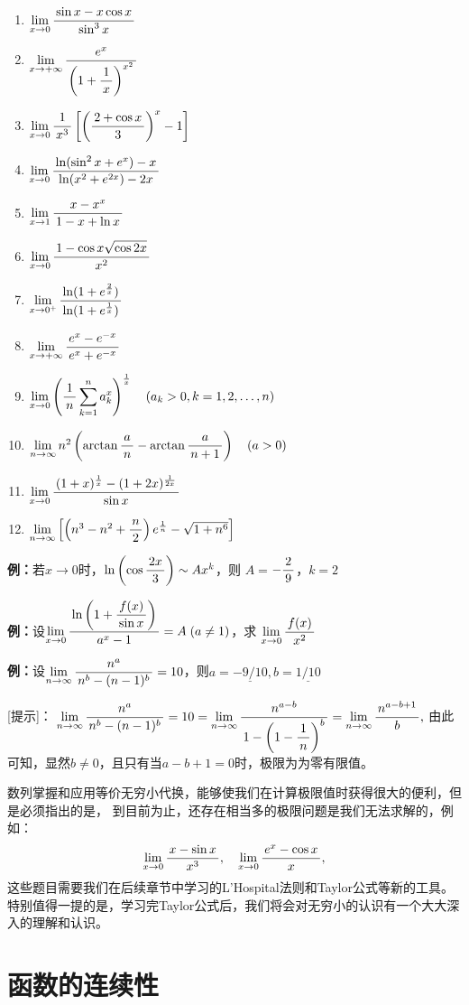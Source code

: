 \begin{enumerate}[(1)]
  \item $\limx0\df{\sin x-x\cos x}{\sin^3x}$
  \item $\limx{+\infty}\df{e^x}{\left(1+\df1x\right)^{x^2}}$
  \item $\limx0\df1{x^3}\left[\left(\df{2+\cos x}3\right)^x-1\right]$
  \item $\limx0\df{\ln(\sin^2x+e^x)-x}{\ln(x^2+e^{2x})-2x}$
  \item $\limx1\df{x-x^x}{1-x+\ln x}$
  \item $\limx0\df{1-\cos x\sqrt{\cos2x}}{x^2}$
  \item $\limx{0^+}\df{\ln(1+e^{\frac2x})}{\ln(1+e^{\frac1x})}$
  \item $\limx{+\infty}\df{e^x-e^{-x}}{e^x+e^{-x}}$
  \item $\limx0\left(\df1n\sum\limits_{k=1}^na_k^x\right)^{\frac1x}
  \quad (a_k>0,k=1,2,\ldots,n)$
  \item $\limn n^2\left(\arctan\df an-\arctan\df a{n+1}\right)\quad (a>0)$
  \item $\limx0\df{(1+x)^{\frac1x}-(1+2x)^{\frac1{2x}}}{\sin x}$
  \item $\limn\left[\left(n^3-n^2+\df n2\right)e^{\frac1n}-\sqrt{1+n^6}\right]$
\end{enumerate}

{\bf 例：}若$x\to 0$时，$\ln\left(\cos\df{2x}3\right)\sim Ax^k$，则
$A=$\underline{$-\df29$}，$k=$\underline{$2$}

{\bf 例：}设$\limx0\df{\ln\left(1+\df{f(x)}{\sin x}\right)}{a^x-1}=A\;(a\ne 1)$，求
$\limx0\df{f(x)}{x^2}$

{\bf 例：}设$\limn\df{n^a}{n^b-(n-1)^b}=10$，则$a=\underline{-9/10},
b=\underline{1/10}$

[提示]：
$\limn\df{n^a}{n^b-(n-1)^b}=10=\limn\df{n^{a-b}}{1-\left(1-\df1n\right)^b}
=\limn\df{n^{a-b+1}}b,$
由此可知，显然$b\ne 0$，且只有当$a-b+1=0$时，极限为为零有限值。

数列掌握和应用等价无穷小代换，能够使我们在计算极限值时获得很大的便利，但是必须指出的是，
到目前为止，还存在相当多的极限问题是我们无法求解的，例如：
$$\limx0\df{x-\sin x}{x^3},
\quad\limx0\df{e^x-\cos x}x,$$
这些题目需要我们在后续章节中学习的L'Hospital法则和Taylor公式等新的工具。
特别值得一提的是，学习完Taylor公式后，我们将会对无穷小的认识有一个大大深入的理解和认识。

\section{函数的连续性}

